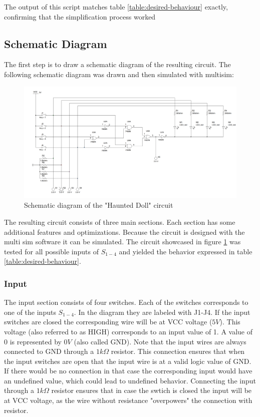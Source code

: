 \documentclass[14pt]{article}
\begin{document}
The output of this script matches table \ref{table:desired-behaviour} exactly, confirming that the simplification process worked

\subsection{Schematic Diagram}

The first step is to draw a schematic diagram of the resulting circuit. The following schematic diagram was drawn and then simulated with multisim:

\begin{figure}[H]
  \includegraphics[width=17cm]{./images/schematic.png}
  \caption{Schematic diagram of the "Haunted Doll" circuit}
  \label{fig:schematic}
\end{figure}

The resulting circuit consists of three main sections. Each section has some additional features and optimizations. Because the circuit is designed
with the multi sim software it can be simulated. The circuit showcased in figure \ref{fig:schematic} was tested for all possible inputs of $S_{1-4}$
and yielded the behavior expressed in table \ref{table:desired-behaviour}. 

\subsubsection{Input}
The input section consists of four switches. Each of the switches corresponds to one of the inputs $S_{1-4}$. In the diagram they are labeled with J1-J4.
If the input switches are closed the corresponding wire will be at VCC voltage ($5V$). This voltage (also referred to as HIGH) corresponds to an input value
of 1. A value of 0 is represented by $0V$ (also called GND). Note that the input wires are always connected to GND through a $1k\Omega$ resistor. This connection ensures
that when the input switches are open that the input wire is at a valid logic value of GND. If there would be no connection in that case the corresponding
input would have an undefined value, which could lead to undefined behavior. Connecting the input through a $1k\Omega$ resistor ensures that in case the swtich
is closed the input will be at VCC voltage, as the wire without resistance "overpowers" the connection with resistor. \\
\end{document}
